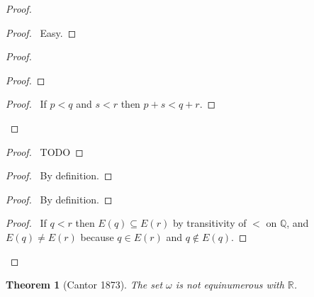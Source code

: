 \documentclass{article}
\let\qed\relax
\newtheorem{theorem}[axiom]{Theorem}
\theoremstyle{definition}
\begin{document}
    \begin{proof}
        \pf
        \begin{proof}
            \pf\ Easy.
        \end{proof}
        \begin{proof}
            \begin{proof}
            \end{proof}
            \begin{proof}
                \pf\ If $p < q$ and $s < r$ then $p+s < q+r$.
            \end{proof}
        \end{proof}
        \begin{proof}
            \pf\ TODO
        \end{proof}
        \begin{proof}
            \pf\ By definition.
        \end{proof}
        \begin{proof}
            \pf\ By definition.
        \end{proof}
        \begin{proof}
            \pf\ If $q < r$ then $E(q) \subseteq E(r)$ by transitivity of $<$ on $\mathbb{Q}$,
            and $E(q) \neq E(r)$ because $q \in E(r)$ and $q \notin E(q)$.
        \end{proof}
        \qed
    \end{proof}

    \begin{theorem}[Cantor 1873]
        The set $\omega$ is not equinumerous with $\mathbb{R}$.
    \end{theorem}
\end{document}
